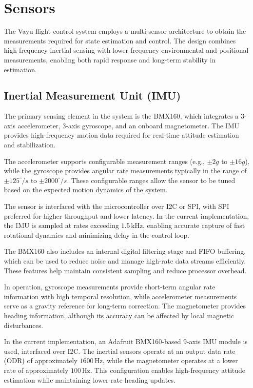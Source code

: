 \section{Sensors}
\label{sec:hw_sensor}

The Vayu flight control system employs a multi-sensor architecture to obtain the measurements required for state estimation and control. The design combines high-frequency inertial sensing with lower-frequency environmental and positional measurements, enabling both rapid response and long-term stability in estimation.

\subsection{Inertial Measurement Unit (IMU)}

The primary sensing element in the system is the BMX160, which integrates a 3-axis accelerometer, 3-axis gyroscope, and an onboard magnetometer. The IMU provides high-frequency motion data required for real-time attitude estimation and stabilization.

The accelerometer supports configurable measurement ranges (e.g., $\pm2g$ to $\pm16g$), while the gyroscope provides angular rate measurements typically in the range of $\pm125^\circ/s$ to $\pm2000^\circ/s$. These configurable ranges allow the sensor to be tuned based on the expected motion dynamics of the system.

The sensor is interfaced with the microcontroller over I2C or SPI, with SPI preferred for higher throughput and lower latency. In the current implementation, the IMU is sampled at rates exceeding $1.5\,\text{kHz}$, enabling accurate capture of fast rotational dynamics and minimizing delay in the control loop.

The BMX160 also includes an internal digital filtering stage and FIFO buffering, which can be used to reduce noise and manage high-rate data streams efficiently. These features help maintain consistent sampling and reduce processor overhead.

In operation, gyroscope measurements provide short-term angular rate information with high temporal resolution, while accelerometer measurements serve as a gravity reference for long-term correction. The magnetometer provides heading information, although its accuracy can be affected by local magnetic disturbances.

In the current implementation, an Adafruit BMX160-based 9-axis IMU module is used, interfaced over I2C. The inertial sensors operate at an output data rate (ODR) of approximately $1600\,\text{Hz}$, while the magnetometer operates at a lower rate of approximately $100\,\text{Hz}$. This configuration enables high-frequency attitude estimation while maintaining lower-rate heading updates.

